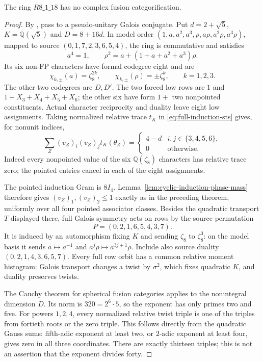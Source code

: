 \begin{theorem}\label{thm:r18-sts-moments}
The ring $R8\_1\_18$ has no complex fusion categorification.
\end{theorem}
\begin{proof}
By \cite[Lemma~3.1]{SchNear}, pass to a pseudo-unitary Galois
conjugate. Put $d=2+\sqrt5$, $K=\mathbb Q(\sqrt5)$ and
$D=8+16d$. In model order
$(1,a,a^2,a^3,\rho,a\rho,a^2\rho,a^3\rho)$, mapped to source
$(0,1,7,2,3,6,5,4)$, the ring is commutative and satisfies
\[
 a^4=1,\qquad \rho^2=a+(1+a+a^2+a^3)\rho.
\]
Its six non-FP characters have formal codegree eight and are
\[
 \chi_{k,\pm}(a)=\zeta_8^{2k},\qquad
 \chi_{k,\pm}(\rho)=\pm\zeta_8^k,\qquad k=1,2,3.
\]
The other two codegrees are $D,D'$.
The two forced low rows are $1$ and $1+X_3+X_4+X_5+X_6$;
the other six have form $1+$ two nonpointed constituents.
Actual character reciprocity and duality leave eight low assignments.
Taking normalized relative trace $t_K$ in
\eqref{eq:full-induction-sts} gives, for nonunit indices,
\[
 \sum_Z(v_Z)_i(v_Z)_j t_K(\theta_Z)
 =\begin{cases}4-d&i,j\in\{3,4,5,6\},\\0&\text{otherwise}.
 \end{cases}
\]
Indeed every nonpointed value of the six $\mathbb Q(\zeta_8)$
characters has relative trace zero; the pointed entries cancel in
each of the eight assignments.

The pointed induction Gram is $8I_4$.
Lemma~\ref{lem:cyclic-induction-phase-mass} therefore gives
$(v_Z)_1,(v_Z)_2\leq1$ exactly as in the preceding theorem,
uniformly over all four pointed associator classes.
Besides the quadratic transport $T$ displayed there, full Galois
symmetry acts on rows by the source permutation
\[
 P=(0,2,1,6,5,4,3,7).
\]
It is induced by an automorphism fixing $K$ and sending
$\zeta_8$ to $\zeta_8^3$: on the model basis it sends
$a\mapsto a^{-1}$ and $a^j\rho\mapsto a^{3j+1}\rho$.
Include also source duality
$(0,2,1,4,3,6,5,7)$. Every full row orbit has a common
relative moment histogram: Galois transport changes a twist by
$\sigma^2$, which fixes quadratic $K$, and duality preserves twists.

The Cauchy theorem for spherical fusion categories
\cite[Theorem~3.9]{BNRWCauchy} applies to the nonintegral
dimension $D$. Its norm is $320=2^6\cdot5$, so the exponent has
only primes two and five. For powers $1,2,4$, every normalized
relative twist triple is one of the triples from fortieth roots
or the zero triple. This follows directly from the quadratic
Gauss sums: fifth-adic exponent at least two, or $2$-adic exponent
at least four, gives zero in all three coordinates. There are
exactly thirteen triples; this is not an assertion that the
exponent divides forty.


\end{proof}
